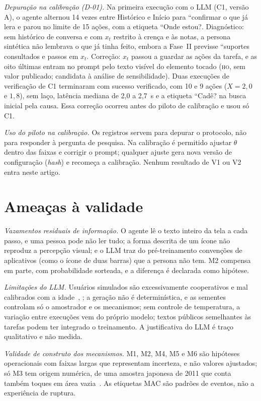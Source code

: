 \documentclass[conference]{IEEEtran}
\newcommand{\stHO}{\textsc{ho}}
\begin{document}
\textit{Depuração na calibração (D-01).} Na primeira execução com o LLM (C1, versão A), o agente alternou 14 vezes entre Histórico e Início para ``confirmar o que já lera e parou no limite de 15 ações, com a etiqueta ``Onde estou?. Diagnóstico: sem histórico de conversa e com $x_t$ restrito à crença e às notas, a persona sintética não lembrava o que já tinha feito, embora a Fase~II previsse ``suportes consultados e passos em $x_t$. Correção: $x_t$ passou a guardar as ações da tarefa, e as oito últimas entram no prompt pelo texto visível do elemento tocado (\stHO, sem valor publicado; candidata à análise de sensibilidade). Duas execuções de verificação de C1 terminaram com sucesso verificado, com 10 e 9 ações ($X = 2{,}0$ e $1{,}8$), sem laço, latência mediana de 2,0 a 2,7~s e a etiqueta ``Cadê? na busca inicial pela causa. Essa correção ocorreu antes do piloto de calibração e usou só C1.

\textit{Uso do piloto na calibração.} Os registros servem para depurar o protocolo, não para responder à pergunta de pesquisa. Na calibração é permitido ajustar $\theta$ dentro das faixas e corrigir o prompt; qualquer ajuste gera nova versão de configuração (\textit{hash}) e recomeça a calibração. Nenhum resultado de V1 ou V2 entra neste artigo.

\section{Ameaças à validade}
\textit{Vazamentos residuais de informação.} O agente lê o texto inteiro da tela a cada passo, e uma pessoa pode não ler tudo; a forma descrita de um ícone não reproduz a percepção visual; e o LLM traz do pré-treinamento convenções de aplicativos (como o ícone de duas barras) que a persona não tem. M2 compensa em parte, com probabilidade sorteada, e a diferença é declarada como hipótese.

\textit{Limitações do LLM.} Usuários simulados são excessivamente cooperativos e mal calibrados com a idade~\cite{seshadri2026}, \cite{zhou2026}; a geração não é determinística, e as sementes controlam só o amostrador e os mecanismos; sem controle de temperatura, a variação entre execuções vem do próprio modelo; textos públicos semelhantes às tarefas podem ter integrado o treinamento. A justificativa do LLM é traço qualitativo e não medida.

\textit{Validade de construto dos mecanismos.} M1, M2, M4, M5 e M6 são hipóteses operacionais com faixas largas que representam incerteza, e não valores ajustados; só M3 tem origem numérica, de uma amostra japonesa de 2011 que conta também toques em área vazia~\cite{kobayashi2011}. As etiquetas MAC são padrões de eventos, não a experiência de ruptura.
\end{document}
